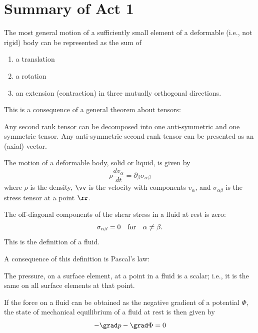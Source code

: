 \documentclass{tufte-book} %
\begin{document}
\section*{Summary of Act 1}
\begin{thm-non}
The most general motion of a sufficiently small element of a
deformable (i.e., not rigid) body can be represented as the sum of 
\begin{enumerate}
\item a translation
\item a rotation
\item an extension (contraction) in three mutually orthogonal
  directions. 
\end{enumerate}
\end{thm-non}
This is a consequence of a general theorem about tensors:
\begin{thm-non}
Any second rank tensor can be decomposed into one
anti-symmetric and one symmetric tensor.  Any anti-symmetric second
rank tensor can be presented as an (axial) vector. 
\end{thm-non}
The motion of a deformable body, solid or liquid, is given by 
\begin{equation}
\rho\frac{dv_{\alpha}}{dt} = \partial_{\beta}\sigma_{\alpha\beta}
\nonumber
\end{equation}
where $\rho$ is the density, $\vv$ is the velocity with components
$v_{\alpha}$,
and $\sigma_{\alpha\beta}$ is the stress tensor at a point $\rr$. 
\begin{def-non}
The off-diagonal components of the shear stress in a fluid at rest is
zero:
\begin{equation}
\sigma_{\alpha\beta} = 0 \quad\text{for}\quad \alpha \neq \beta \/.
\nonumber
\end{equation}
This is the definition of a fluid.
\end{def-non}
A consequence of this definition is Pascal's law:
\begin{thm-non}
The pressure, on a surface element, at a point in a fluid is a scalar;
i.e., it is the same on all surface elements at that point.  
\end{thm-non}
 If the force on a fluid can be obtained as the negative gradient of a potential
$\Phi$, the state of mechanical equilibrium of a fluid
at rest is then given by 
\begin{equation}
-\grad p - \grad \Phi = 0 
\nonumber
\end{equation}

\end{document}
